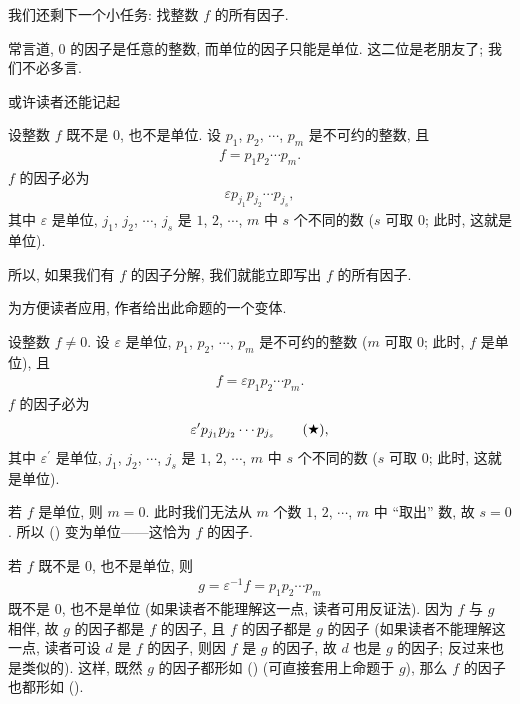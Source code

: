 \myLine

我们还剩下一个小任务: 找整数 $f$ 的所有因子.

常言道, $0$ 的因子是任意的整数, 而单位的因子只能是单位. 这二位是老朋友了; 我们不必多言.

或许读者还能记起
\begin{proposition}
    设整数 $f$ 既不是 $0$, 也不是单位. 设 $p_1$, $p_2$, $\cdots$, $p_m$ 是不可约的整数, 且
    \begin{align*}
        f = p_1 p_2 \cdots p_m.
    \end{align*}
    $f$ 的因子必为
    \begin{align*}
        \varepsilon p_{j_1} p_{j_2} \cdots p_{j_s},
    \end{align*}
    其中 $\varepsilon$ 是单位, $j_1$, $j_2$, $\cdots$, $j_s$ 是 $1$, $2$, $\cdots$, $m$ 中 $s$ 个不同的数 ($s$ 可取 $0$; 此时, 这就是单位).
\end{proposition}

所以, 如果我们有 $f$ 的因子分解, 我们就能立即写出 $f$ 的所有因子.

为方便读者应用, 作者给出此命题的一个变体.

\begin{proposition}
    设整数 $f \neq 0$. 设 $\varepsilon$ 是单位, $p_1$, $p_2$, $\cdots$, $p_m$ 是不可约的整数 ($m$ 可取 $0$; 此时, $f$ 是单位), 且
    \begin{align*}
        f = \varepsilon p_1 p_2 \cdots p_m.
    \end{align*}
    $f$ 的因子必为
    \begin{align*}
        \varepsilon^{\prime} p_{j_1} p_{j_2} \cdots p_{j_s} \tag*{(\ding{72})},
    \end{align*}
    其中 $\varepsilon^{\prime}$ 是单位, $j_1$, $j_2$, $\cdots$, $j_s$ 是 $1$, $2$, $\cdots$, $m$ 中 $s$ 个不同的数 ($s$ 可取 $0$; 此时, 这就是单位).
\end{proposition}

\begin{pf}
    若 $f$ 是单位, 则 $m = 0$. 此时我们无法从 $m$ 个数 $1$, $2$, $\cdots$, $m$ 中 ``取出'' 数, 故 $s = 0$. 所以 () 变为单位——这恰为 $f$ 的因子.

    若 $f$ 既不是 $0$, 也不是单位, 则
    \begin{align*}
        g = \varepsilon^{-1} f = p_1 p_2 \cdots p_m
    \end{align*}
    既不是 $0$, 也不是单位 (如果读者不能理解这一点, 读者可用反证法). 因为 $f$ 与 $g$ 相伴, 故 $g$ 的因子都是 $f$ 的因子, 且 $f$ 的因子都是 $g$ 的因子 (如果读者不能理解这一点, 读者可设 $d$ 是 $f$ 的因子, 则因 $f$ 是 $g$ 的因子, 故 $d$ 也是 $g$ 的因子; 反过来也是类似的). 这样, 既然 $g$ 的因子都形如 () (可直接套用上命题于 $g$), 那么 $f$ 的因子也都形如 ().
\end{pf}

